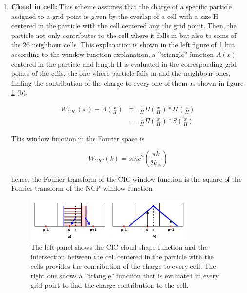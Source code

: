 \begin{enumerate}
\item \textbf{ Cloud in cell: } This scheme assumes that the charge of a specific particle 
assigned to a grid point is given by the overlap of a cell with a size H centered in 
the particle with the cell centered any the grid point. Then, the particle not only 
contributes to the cell where it falls in but also to some of the 26 neighbour cells. 
This explanation is shown in the left figure of \ref{CIC} but according to the window 
function explanation, a ''triangle'' function $\Lambda(x)$ centered in the particle and length
H is evaluated in the corresponding grid points of the cells, the one where particle falls 
in and the neighbour ones, finding the contribution of the charge to every one of them
as shown in figure  \ref{CIC} (b).  

\begin{eqnarray*}
 W_{CIC}(x)  =  \Lambda \left( \frac{x}{H} \right) & \equiv & \frac{1}{H}\Pi\left(\frac{x}{H}\right) *\Pi \left(\frac{x}{H}\right) \\ 
&  = &\frac{1}{H}\Pi\left(\frac{x}{H}\right)*S\left(\frac{x}{H}\right)
\end{eqnarray*}

This window function in the Fourier space is

\[ W_{CIC}(k)= sinc^2\left(\frac{\pi k}{2k_N} \right)\]

hence, the Fourier transform of the CIC window function is the square of the Fourier 
transform of the NGP window function. 

\begin{figure}[htbp]
       \centering
               \includegraphics[width=0.8\textwidth]{Images/chapter3/CIC.png}
       \caption{\small The left panel shows the CIC cloud shape function and the intersection
       between the cell centered in the particle with the cells provides the contribution of
       the charge to every cell. The right one shows a ''triangle''	 function that is evaluated
       in every grid point to find the charge contribution to the cell. }
       \label{CIC}
 \end{figure}


\end{enumerate}
